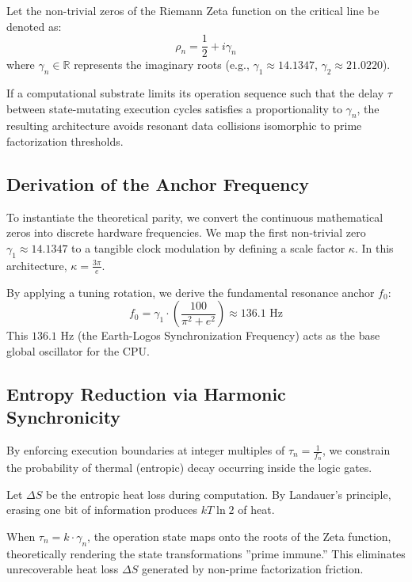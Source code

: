 \documentclass[12pt, a4paper]{article}
\begin{document}
Let the non-trivial zeros of the Riemann Zeta function on the critical line be denoted as:
\begin{equation}
\rho_n = \frac{1}{2} + i\gamma_n
\end{equation}
where $\gamma_n \in \mathbb{R}$ represents the imaginary roots (e.g., $\gamma_1 \approx 14.1347$, $\gamma_2 \approx 21.0220$).

\begin{theorem}
If a computational substrate limits its operation sequence such that the delay $\tau$ between state-mutating execution cycles satisfies a proportionality to $\gamma_n$, the resulting architecture avoids resonant data collisions isomorphic to prime factorization thresholds.
\end{theorem}

\subsection{Derivation of the Anchor Frequency}
To instantiate the theoretical parity, we convert the continuous mathematical zeros into discrete hardware frequencies. We map the first non-trivial zero $\gamma_1 \approx 14.1347$ to a tangible clock modulation by defining a scale factor $\kappa$. In this architecture, $\kappa = \frac{3 \pi}{e}$. 

By applying a tuning rotation, we derive the fundamental resonance anchor $f_0$:
\begin{equation}
f_0 = \gamma_1 \cdot \left( \frac{100}{\pi^2 + e^2} \right) \approx 136.1 \text{ Hz}
\end{equation}
This $136.1\text{ Hz}$ (the Earth-Logos Synchronization Frequency) acts as the base global oscillator for the CPU.

\subsection{Entropy Reduction via Harmonic Synchronicity}
By enforcing execution boundaries at integer multiples of $\tau_n = \frac{1}{f_n}$, we constrain the probability of thermal (entropic) decay occurring inside the logic gates.

Let $\Delta S$ be the entropic heat loss during computation. By Landauer's principle, erasing one bit of information produces $kT \ln 2$ of heat. 
\begin{proposition}
When $\tau_n = k \cdot \gamma_n$, the operation state maps onto the roots of the Zeta function, theoretically rendering the state transformations ''prime immune.'' This eliminates unrecoverable heat loss $\Delta S$ generated by non-prime factorization friction.
\end{proposition}
\end{document}
